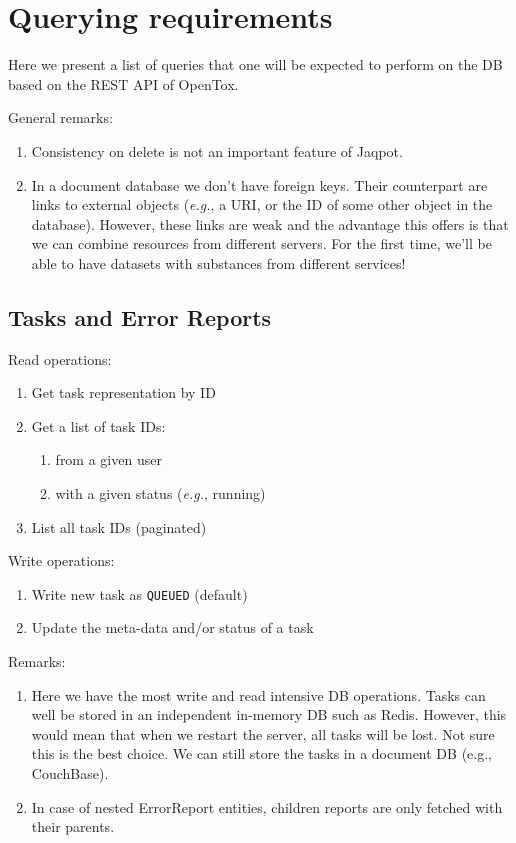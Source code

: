 \section{Querying requirements}



\noindent Here we present a list of queries that one will be expected 
to perform on the DB based on the REST API of OpenTox.

\noindent General remarks:
\begin{enumerate}
 \item Consistency on delete is not an important feature of Jaqpot.
 \item In a document database we don't have foreign keys. Their counterpart are 
 links to external objects (\textit{e.g.}, a URI, or the ID of some other object
 in the database). However, these links are weak and the advantage this offers
 is that we can combine resources from different servers. For the first time, we'll
 be able to have datasets with substances from different services!
\end{enumerate}


\subsection{Tasks and Error Reports}

\noindent Read operations:
\begin{enumerate}
 \item Get task representation by ID
 \item Get a list of task IDs:
    \begin{enumerate}
    \item from a given user
    \item with a given status (\textit{e.g.}, running)
    \end{enumerate}
 \item List all task IDs (paginated)
\end{enumerate}

\noindent Write operations:
\begin{enumerate}
 \item Write new task as \texttt{QUEUED} (default)
 \item Update the meta-data and/or status of a task
\end{enumerate}

\noindent Remarks:
\begin{enumerate}
 \item 	Here we have the most write and read intensive DB 
	operations. Tasks can well be stored in an independent 
	in-memory DB such as Redis. However, this would mean 
	that when we restart the server, all tasks will be lost. 
	Not sure this is the best choice. We can still store the 
	tasks in a document DB (e.g., CouchBase).
 \item 	In case of nested ErrorReport entities, children reports are 
        only fetched with their parents.
\end{enumerate}



